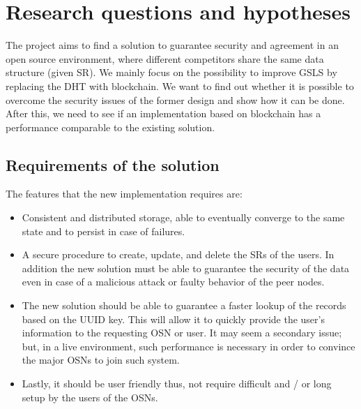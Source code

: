 \section{Research questions and hypotheses}
\label{S:3}

The project aims to find a solution to guarantee security and agreement in an open source environment, where different competitors share the same data structure (given SR). We mainly focus on the possibility to improve GSLS by replacing the DHT with blockchain. We want to find out whether it is possible to overcome the security issues of the former design and show how it can be done. After this, we need to see if an implementation based on blockchain has a performance comparable to the existing solution. 

\subsection{Requirements of the solution}

The features that the new implementation requires are:

\begin{itemize}
  \item Consistent and distributed storage, able to eventually converge to the same state and to persist in case of failures.
  \item A secure procedure to create, update, and delete the SRs of the users. In addition the new solution must be able to guarantee the security of the data even in case of a malicious attack or faulty behavior of the peer nodes.
  \item The new solution should be able to guarantee a faster lookup of the records based on the UUID key. This will allow it to quickly provide the user's information to the requesting OSN or user. It may seem a secondary issue; but, in a live environment, such performance is necessary in order to convince the major OSNs to join such system.
  \item Lastly, it should be user friendly thus, not require difficult and / or long setup by the users of the OSNs.
\end{itemize}



